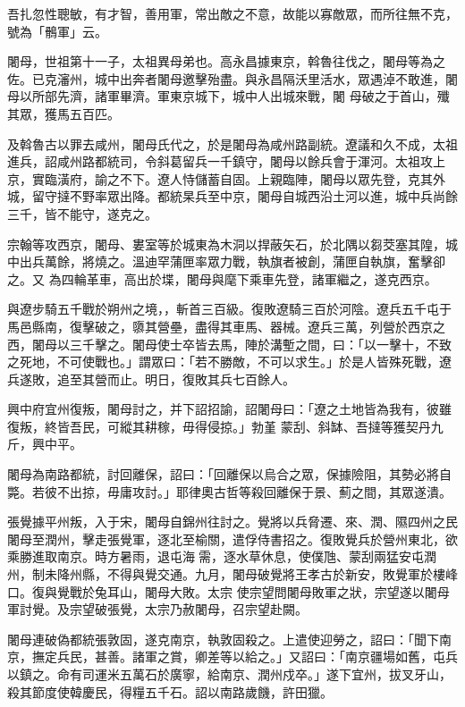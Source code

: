\begin{pinyinscope}
 吾扎忽性聰敏，有才智，善用軍，常出敵之不意，故能以寡敵眾，而所往無不克，號為「鶻軍」云。



 闍母，世祖第十一子，太祖異母弟也。高永昌據東京，斡魯往伐之，闍母等為之佐。已克瀋州，城中出奔者闍母邀擊殆盡。與永昌隔沃里活水，眾遇淖不敢進，闍母以所部先濟，諸軍畢濟。軍東京城下，城中人出城來戰，闍
 母破之于首山，殲其眾，獲馬五百匹。



 及斡魯古以罪去咸州，闍母氏代之，於是闍母為咸州路副統。遼議和久不成，太祖進兵，詔咸州路都統司，令斜葛留兵一千鎮守，闍母以餘兵會于渾河。太祖攻上京，實臨潢府，諭之不下。遼人恃儲蓄自固。上親臨陣，闍母以眾先登，克其外城，留守撻不野率眾出降。都統杲兵至中京，闍母自城西沿土河以進，城中兵尚餘三千，皆不能守，遂克之。



 宗翰等攻西京，闍母、婁室等於城東為木洞以捍蔽矢石，於北隅以芻茭塞其隍，城中出兵萬餘，將燒之。溫迪罕蒲匣率眾力戰，執旗者被創，蒲匣自執旗，奮擊卻之。又
 為四輪革車，高出於堞，闍母與麾下乘車先登，諸軍繼之，遂克西京。



 與遼步騎五千戰於朔州之境，，斬首三百級。復敗遼騎三百於河陰。遼兵五千屯于馬邑縣南，復擊破之，隳其營壘，盡得其車馬、器械。遼兵三萬，列營於西京之西，闍母以三千擊之。闍母使士卒皆去馬，陣於溝塹之間，曰：「以一擊十，不致之死地，不可使戰也。」謂眾曰：「若不勝敵，不可以求生。」於是人皆殊死戰，遼兵遂敗，追至其營而止。明日，復敗其兵七百餘人。



 興中府宜州復叛，闍母討之，并下詔招諭，詔闍母曰：「遼之土地皆為我有，彼雖復叛，終皆吾民，可縱其耕稼，毋得侵掠。」勃堇
 蒙刮、斜缽、吾撻等獲契丹九斤，興中平。



 闍母為南路都統，討回離保，詔曰：「回離保以烏合之眾，保據險阻，其勢必將自斃。若彼不出掠，毋庸攻討。」耶律奧古哲等殺回離保于景、薊之間，其眾遂潰。



 張覺據平州叛，入于宋，闍母自錦州往討之。覺將以兵脅遷、來、潤、隰四州之民闍母至潤州，擊走張覺軍，逐北至榆關，遣俘侍書招之。復敗覺兵於營州東北，欲乘勝進取南京。時方暑雨，退屯海需，逐水草休息，使僕虺、蒙刮兩猛安屯潤州，制未降州縣，不得與覺交通。九月，闍母破覺將王孝古於新安，敗覺軍於樓峰口。復與覺戰於兔耳山，闍母大敗。太宗
 使宗望問闍母敗軍之狀，宗望遂以闍母軍討覺。及宗望破張覺，太宗乃赦闍母，召宗望赴闕。



 闍母連破偽都統張敦固，遂克南京，執敦固殺之。上遣使迎勞之，詔曰：「聞下南京，撫定兵民，甚善。諸軍之賞，卿差等以給之。」又詔曰：「南京疆場如舊，屯兵以鎮之。命有司運米五萬石於廣寧，給南京、潤州戍卒。」遂下宜州，拔叉牙山，殺其節度使韓慶民，得糧五千石。詔以南路歲饑，許田獵。




\end{pinyinscope}
